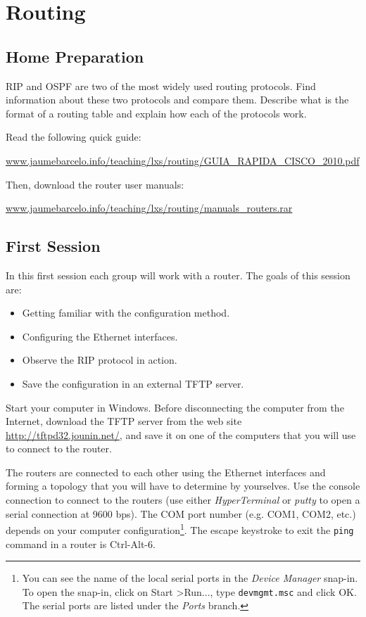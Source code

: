 \chapter{Routing}

\section{Home Preparation}

RIP and OSPF are two of the most widely used routing protocols. Find information about these two protocols and compare them. Describe what is the format of a routing table and explain how each of the protocols work.

Read the following quick guide:

\url{www.jaumebarcelo.info/teaching/lxs/routing/GUIA_RAPIDA_CISCO_2010.pdf}

Then, download the router user manuals:

\url{www.jaumebarcelo.info/teaching/lxs/routing/manuals_routers.rar}

\section{First Session}

In this first session each group will work with a router. The goals of this session are:
\begin{itemize}
\item Getting familiar with the configuration method.
\item Configuring the Ethernet interfaces.
\item Observe the RIP protocol in action.
\item Save the configuration in an external TFTP server.
\end{itemize}

Start your computer in Windows. Before disconnecting the computer from the Internet, download the TFTP server from the web site \url{http://tftpd32.jounin.net/}, and save it on one of the computers that you will use to connect to the router.

The routers are connected to each other using the Ethernet interfaces and forming a topology that you will have to determine by yourselves. Use the console connection to connect to the routers (use either \emph{HyperTerminal} or \emph{putty} to open a serial connection at 9600 bps). The COM port number (e.g. COM1, COM2, etc.) depends on your computer configuration\footnote{You can see the name of the local serial ports in the \emph{Device Manager} snap-in. To open the snap-in, click on \textsf{Start} \textgreater \textsf{Run...}, type \texttt{devmgmt.msc} and click \textsf{OK}. The serial ports are listed under the \emph{Ports} branch.}. The escape keystroke to exit the \texttt{ping} command in a router is \textsf{Ctrl-Alt-6}.

